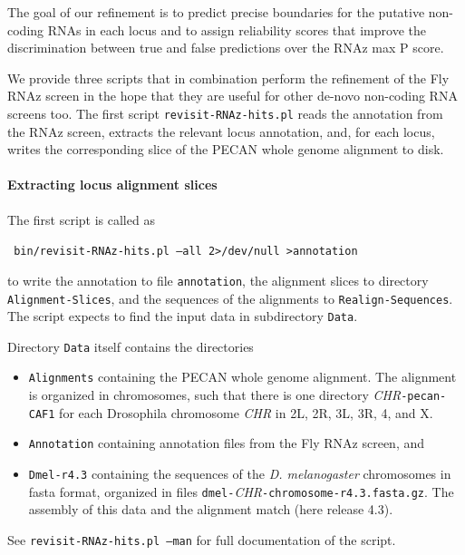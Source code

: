 \documentclass{article}
\newenvironment{ttbox}{%
  \begin{framed}\begin{minipage}{1.0\textwidth}\tt}%
{\end{minipage}\end{framed}}
\begin{document}
The goal of our refinement is to predict precise boundaries for the
putative non-coding RNAs in each locus and to assign reliability
scores that improve the discrimination between true and false
predictions over the RNAz max P score.

We provide three scripts that in combination perform the refinement of
the Fly RNAz screen in the hope that they are useful for other de-novo
non-coding RNA screens too. The first script
\texttt{revisit-RNAz-hits.pl} reads the annotation from the RNAz
screen, extracts the relevant locus annotation, and, for each locus,
writes the corresponding slice of the PECAN whole genome alignment to
disk.

\paragraph{Extracting locus alignment slices}
The first script is called as 
\begin{ttbox}
  bin/revisit-RNAz-hits.pl --all 2>/dev/null >annotation
\end{ttbox}
\noindent
to write the annotation to file \texttt{annotation}, the alignment
slices to directory \texttt{Alignment-Slices}, and the sequences of
the alignments to \texttt{Realign-Sequences}. The script expects to
find the input data in subdirectory \texttt{Data}.

Directory \texttt{Data} itself contains the directories
\begin{itemize}
\item \texttt{Alignments} containing the PECAN whole genome
  alignment. The alignment is organized in chromosomes, such that
  there is one directory \emph{CHR}\texttt{-pecan-CAF1} for each
  Drosophila chromosome \emph{CHR} in 2L, 2R, 3L, 3R, 4, and X.
\item \texttt{Annotation} containing annotation files from the Fly RNAz screen, and
\item \texttt{Dmel-r4.3} containing the sequences of the
  \emph{D. melanogaster} chromosomes in fasta format, organized in
  files
  \texttt{dmel-}\emph{CHR}\texttt{-chromosome-r4.3.fasta.gz}. The
  assembly of this data and the alignment match (here release 4.3).
\end{itemize}

See \texttt{revisit-RNAz-hits.pl --man} for full documentation of the
script.
\end{document}
